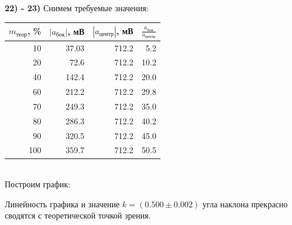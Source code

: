 \documentclass[a4paper,12pt]{extarticle}
\begin{document}
\indent \textbf{22) - 23)} Снимем требуемые значения:
\begin{tabular}{|r|r|r|r|}
\hline
\multicolumn{1}{|l|}{$m_{\text{теор}}$, \%} & \multicolumn{1}{l|}{$|a_{\text{бок}}|$, мВ} & \multicolumn{1}{l|}{$|a_{\text{центр}}|$, мВ} & \multicolumn{1}{l|}{$\frac{a_{\text{бок}}}{a_{\text{центр}}}$}\\ \hline
10                     & 37.03                 & 712.2                 & 5.2                   \\ \hline
20                     & 72.6                  & 712.2                 & 10.2                  \\ \hline
40                     & 142.4                 & 712.2                 & 20.0                  \\ \hline
60                     & 212.2                 & 712.2                 & 29.8                  \\ \hline
70                     & 249.3                 & 712.2                 & 35.0                  \\ \hline
80                     & 286.3                 & 712.2                 & 40.2                  \\ \hline
90                     & 320.5                 & 712.2                 & 45.0                  \\ \hline
100                    & 359.7                 & 712.2                 & 50.5                  \\ \hline
\end{tabular}\\
Построим график:
\begin{minipage}{0.5\textwidth}
    \end{minipage}
    Линейность графика и значение $k = (0.500\pm0.002)$ угла наклона прекрасно сводятся с теоретической точкой зрения.
\end{document}
